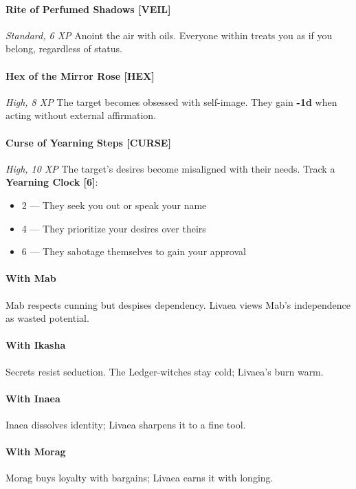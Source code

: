 \documentclass[11pt]{book}
\begin{document}
\paragraph{Rite of Perfumed Shadows [VEIL]}
\emph{Standard, 6 XP}  
Anoint the air with oils.  
Everyone within treats you as if you belong, regardless of status.

\paragraph{Hex of the Mirror Rose [HEX]}
\emph{High, 8 XP}  
The target becomes obsessed with self-image.  
They gain \textbf{-1d} when acting without external affirmation.

\paragraph{Curse of Yearning Steps [CURSE]}
\emph{High, 10 XP}  
The target's desires become misaligned with their needs.  
Track a \textbf{Yearning Clock [6]}:
\begin{itemize}
    \item 2 --- They seek you out or speak your name
    \item 4 --- They prioritize your desires over theirs
    \item 6 --- They sabotage themselves to gain your approval
\end{itemize}

\paragraph{With Mab}  
Mab respects cunning but despises dependency.  
Livaea views Mab's independence as wasted potential.

\paragraph{With Ikasha}  
Secrets resist seduction.  
The Ledger-witches stay cold; Livaea's burn warm.

\paragraph{With Inaea}  
Inaea dissolves identity; Livaea sharpens it to a fine tool.

\paragraph{With Morag}  
Morag buys loyalty with bargains;  
Livaea earns it with longing.
\end{document}
